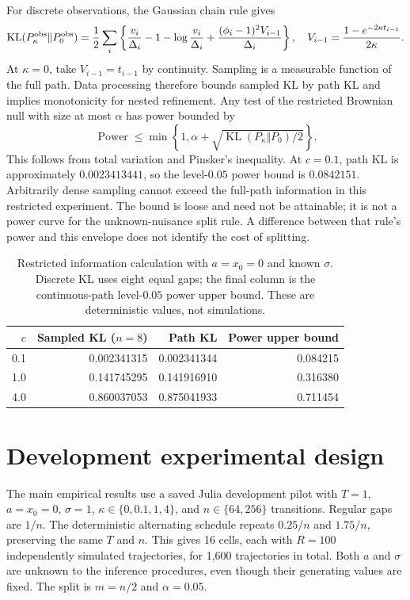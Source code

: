 \documentclass[11pt]{article}
\newcommand{\KL}{\operatorname{KL}}
\begin{document}
For discrete observations, the Gaussian chain rule gives
\begin{equation}
 \KL(P_\kappa^{\rm obs}\Vert P_0^{\rm obs})
 =\frac12\sum_i\left\{
 \frac{v_i}{\Delta_i}-1-\log\frac{v_i}{\Delta_i}
 +\frac{(\phi_i-1)^2 V_{i-1}}{\Delta_i}\right\},
 \quad
 V_{i-1}=\frac{1-e^{-2\kappa t_{i-1}}}{2\kappa}.
 \label{eq:sample-kl}
\end{equation}
At $\kappa=0$, take $V_{i-1}=t_{i-1}$ by continuity.
Sampling is a measurable function of the full path. Data processing therefore
bounds sampled KL by path KL and implies monotonicity for nested refinement.
Any test of the restricted Brownian null with size at most $\alpha$ has power
bounded by
\begin{equation}
 \operatorname{Power}\leq
 \min\left\{1,\alpha+\sqrt{\KL(P_\kappa\Vert P_0)/2}\right\}.
 \label{eq:pinsker}
\end{equation}
This follows from total variation and Pinsker's inequality. At $c=0.1$,
path KL is approximately $0.0023413441$, so the level-$0.05$ power bound is
$0.0842151$. Arbitrarily dense sampling cannot exceed the full-path information
in this restricted experiment. The bound is loose and need not be attainable;
it is not a power curve for the unknown-nuisance split rule. A difference between
that rule's power and this envelope does not identify the cost of splitting.

\begin{table}[!htbp]
\centering\small
\caption{Restricted information calculation with $a=x_0=0$ and known $\sigma$.
Discrete KL uses eight equal gaps; the final column is the continuous-path
level-$0.05$ power upper bound. These are deterministic values, not simulations.}
\label{tab:information}
\begin{tabular}{rrrr}
\toprule
$c$ & Sampled KL ($n=8$) & Path KL & Power upper bound\\
\midrule
0.1 & 0.002341315 & 0.002341344 & 0.084215 \\
1.0 & 0.141745295 & 0.141916910 & 0.316380 \\
4.0 & 0.860037053 & 0.875041933 & 0.711454 \\
\bottomrule
\end{tabular}
\end{table}

\section{Development experimental design}
The main empirical results use a saved Julia development pilot with
$T=1$, $a=x_0=0$, $\sigma=1$, $\kappa\in\{0,0.1,1,4\}$, and
$n\in\{64,256\}$ transitions. Regular gaps are $1/n$. The deterministic
alternating schedule repeats $0.25/n$ and $1.75/n$, preserving the same $T$
and $n$. This gives 16 cells, each with $R=100$ independently simulated
trajectories, for 1,600 trajectories in total. Both $a$ and $\sigma$ are
unknown to the inference procedures, even though their generating values are
fixed. The split is $m=n/2$ and $\alpha=0.05$.
\end{document}
